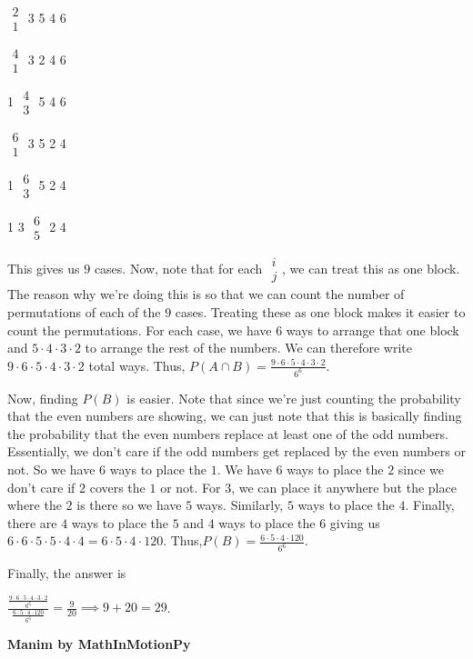 \begin{enumerate}
 $\substack{\textstyle 2 \\ \textstyle 1}$ 3 5 4 6

 $\substack{\textstyle 4 \\ \textstyle 1}$ 3 2 4 6

 1 $\substack{\textstyle 4 \\ \textstyle 3}$ 5 4 6

 $\substack{\textstyle 6 \\ \textstyle 1}$ 3 5 2 4

 1 $\substack{\textstyle 6 \\ \textstyle 3}$ 5 2 4

 1 3 $\substack{\textstyle 6 \\ \textstyle 5}$ 2 4

 This gives us $9$ cases. Now, note that for each $\substack{\textstyle i \\ \textstyle j}$, we can treat this as one block. The reason why we're doing this is so that we can count the number of permutations of each of the $9$ cases. Treating these as one block makes it easier to count the permutations. For each case, we have $6$ ways to arrange that one block and $5 \cdot 4 \cdot 3 \cdot 2$ to arrange the rest of the numbers. We can therefore write $9 \cdot 6 \cdot 5 \cdot 4 \cdot 3 \cdot 2$ total ways. Thus, $P(A \cap B) = \frac{9 \cdot 6 \cdot 5 \cdot 4 \cdot 3 \cdot 2}{6^6}$. 

 Now, finding $P(B)$ is easier. Note that since we're just counting the probability that the even numbers are showing, we can just note that this is basically finding the probability that the even numbers replace at least one of the odd numbers. Essentially, we don't care if the odd numbers get replaced by the even numbers or not. So we have $6$ ways to place the $1$. We have $6$ ways to place the $2$ since we don't care if $2$ covers the $1$ or not. For $3$, we can place it anywhere but the place where the $2$ is there so we have $5$ ways. Similarly, $5$ ways to place the $4$. Finally, there are $4$ ways to place the $5$ and $4$ ways to place the $6$ giving us$6 \cdot 6 \cdot 5 \cdot 5 \cdot 4 \cdot 4 = 6 \cdot 5 \cdot 4 \cdot 120$. Thus,$P(B) = \frac{6 \cdot 5 \cdot 4 \cdot 120}{6^6}$.

 Finally, the answer is

 $\frac{\frac{9 \cdot 6 \cdot 5 \cdot 4 \cdot 3 \cdot 2}{6^6}}{\frac{6 \cdot 5 \cdot 4 \cdot 120}{6^6}} = \frac{9}{20} \implies 9 + 20 = \boxed{29}$.

 \textbf{Manim by MathInMotionPy} 



\end{enumerate}
